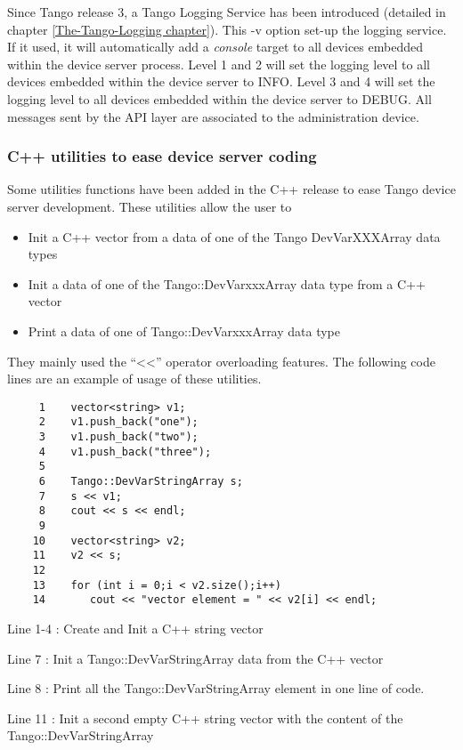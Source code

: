 Since Tango release 3, a Tango Logging Service has been introduced
(detailed in chapter \ref{The-Tango-Logging chapter}). This -v option
set-up the logging service. If it used, it will automatically add
a \emph{console} target to all devices embedded within the device
server process. Level 1 and 2 will set the logging level to all devices
embedded within the device server to INFO. Level 3 and 4 will set
the logging level to all devices embedded within the
device server to DEBUG. All messages sent by the API layer are associated
to the administration device.


\subsubsection{C++ utilities to ease device server coding}

Some utilities functions have been added in the C++ release to ease
Tango device server development. These utilities allow the user to
\begin{itemize}
\item Init a C++ vector from a data of one of the Tango DevVarXXXArray data
types 
\item Init a data of one of the Tango::DevVarxxxArray data type from a C++
vector
\item Print a data of one of Tango::DevVarxxxArray data type
\end{itemize}
They mainly used the ``<\textcompwordmark{}<''
operator overloading features. The following code lines are an example
of usage of these utilities.


\begin{verbatim}
     1    vector<string> v1;
     2    v1.push_back("one");
     3    v1.push_back("two");
     4    v1.push_back("three");
     5          
     6    Tango::DevVarStringArray s;
     7    s << v1;
     8    cout << s << endl;
     9  
    10    vector<string> v2;
    11    v2 << s;
    12          
    13    for (int i = 0;i < v2.size();i++)
    14       cout << "vector element = " << v2[i] << endl;
\end{verbatim}


Line 1-4 : Create and Init a C++ string vector

Line 7 : Init a Tango::DevVarStringArray data from the C++ vector

Line 8 : Print all the Tango::DevVarStringArray element in one line
of code.

Line 11 : Init a second empty C++ string vector with the content of
the Tango::DevVarStringArray

